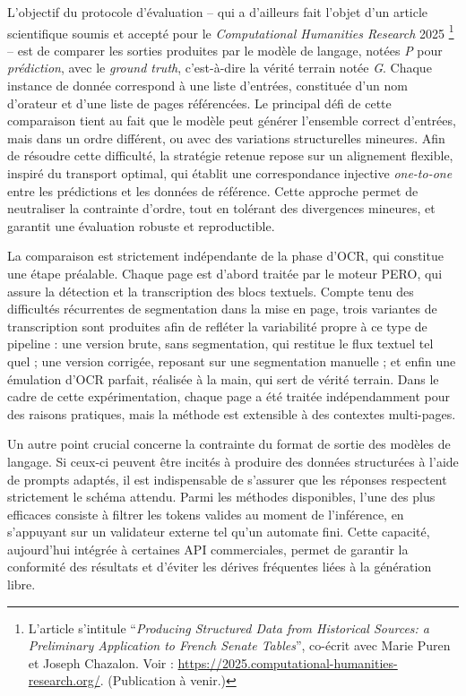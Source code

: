 L’objectif du protocole d’évaluation -- qui a d'ailleurs fait l'objet d'un article scientifique soumis et accepté pour le \emph{Computational Humanities Research} 2025
\footnote{L’article s’intitule \enquote{\mkbibemph{Producing Structured Data from Historical Sources: a Preliminary Application to French Senate Tables}}, co-écrit avec Marie Puren et Joseph Chazalon. Voir : \url{https://2025.computational-humanities-research.org/}. (Publication à venir.)}
 -- est de comparer les sorties produites par le modèle de langage, notées \emph{P} pour \emph{prédiction}, avec le \emph{ground truth}, c’est-à-dire la vérité terrain notée \emph{G}. Chaque instance de donnée correspond à une liste d’entrées, constituée d’un nom d’orateur et d’une liste de pages référencées. Le principal défi de cette comparaison tient au fait que le modèle peut générer l’ensemble correct d’entrées, mais dans un ordre différent, ou avec des variations structurelles mineures. Afin de résoudre cette difficulté, la stratégie retenue repose sur un alignement flexible, inspiré du transport optimal, qui établit une correspondance injective \emph{one-to-one} entre les prédictions et les données de référence. Cette approche permet de neutraliser la contrainte d’ordre, tout en tolérant des divergences mineures, et garantit une évaluation robuste et reproductible.

La comparaison est strictement indépendante de la phase d’OCR, qui constitue une étape préalable. Chaque page est d’abord traitée par le moteur PERO, qui assure la détection et la transcription des blocs textuels. Compte tenu des difficultés récurrentes de segmentation dans la mise en page, trois variantes de transcription sont produites afin de refléter la variabilité propre à ce type de pipeline : une version brute, sans segmentation, qui restitue le flux textuel tel quel ; une version corrigée, reposant sur une segmentation manuelle ; et enfin une émulation d’OCR parfait, réalisée à la main, qui sert de vérité terrain. Dans le cadre de cette expérimentation, chaque page a été traitée indépendamment pour des raisons pratiques, mais la méthode est extensible à des contextes multi-pages.

Un autre point crucial concerne la contrainte du format de sortie des modèles de langage. Si ceux-ci peuvent être incités à produire des données structurées à l’aide de prompts adaptés, il est indispensable de s’assurer que les réponses respectent strictement le schéma attendu. Parmi les méthodes disponibles, l’une des plus efficaces consiste à filtrer les tokens valides au moment de l’inférence, en s’appuyant sur un validateur externe tel qu’un automate fini. Cette capacité, aujourd’hui intégrée à certaines API commerciales, permet de garantir la conformité des résultats et d’éviter les dérives fréquentes liées à la génération libre.

